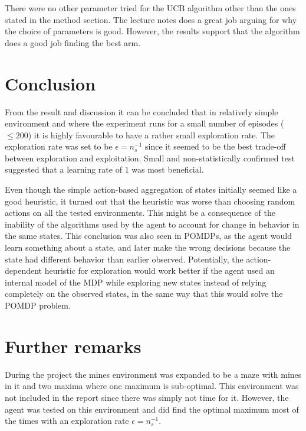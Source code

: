 \documentclass[11pt]{article}
\numberwithin{equation}{section}
\begin{document}
\begin{flushleft}
There were no other parameter tried for the UCB algorithm other than the ones stated in the method section. The lecture notes does a great job arguing for why the choice of parameters is good. However, the results support that the algorithm does a good job finding the best arm. \newline



\section{Conclusion}

From the result and discussion it can be concluded that in relatively simple environment and where the experiment runs for a small number of episodes ($\le 200$) it is highly favourable to have a rather small exploration rate. The exploration rate was set to be $\epsilon = n_s^{-1}$ since it seemed to be the best trade-off between exploration and exploitation. Small and non-statistically confirmed test suggested that a learning rate of $1$ was most beneficial.  \newline

Even though the simple action-based aggregation of states initially seemed like a good heuristic, it turned out that the heuristic was worse than choosing random actions on all the tested environments. This might be a consequence of the inability of the algorithms used by the agent to account for change in behavior in the same states. This conclusion was also seen in POMDPs, as the agent would learn something about a state, and later make the wrong decisions because the state had different behavior than earlier observed. Potentially, the action-dependent heuristic for exploration would work better if the agent used an internal model of the MDP while exploring new states instead of relying completely on the observed states, in the same way that this would solve the POMDP problem.

\section{Further remarks}

During the project the mines environment was expanded to be a maze with mines in it and two maxima where one maximum is sub-optimal. This environment was not included in the report since there was simply not time for it. However, the agent was tested on this environment and did find the optimal maximum most of the times with an exploration rate $\epsilon = n_s^{-1}$. \newline 

\end{flushleft}
\end{document}
